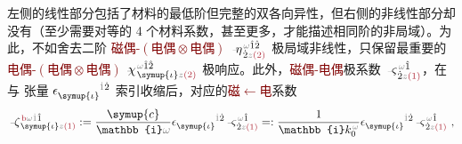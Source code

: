  左侧的线性部分包括了材料的最低阶但完整的双各向异性\cite{langeMultipoleTheoryHehl2015}，但右侧的非线性部分却没有（至少需要对等的 4 个材料系数，甚至更多，才能描述相同阶的非局域）。为此，不如舍去二阶 \textcolor{Maroon}{磁偶-$(\text{电偶}\otimes\text{电偶})$} $\Xint{\begin{smallmatrix} ~ \\ {}^{}_{\mathcolor{gray}{-}} \\ ~ \end{smallmatrix}}{17}{\eta}^{\;\! \mathcolor{gray}{\omega} \hat{1} \hat{2}}_{\;\! \dot{2} \mathcolor{gray}{z} \textcolor{Maroon}{(2)}}$ 极局域非线性，只保留最重要的\textcolor{Maroon}{电偶-$(\text{电偶}\otimes\text{电偶})$} $\Xint{{}^{}_{\mathcolor{gray}{-}}}{23}{\chi}^{\;\! \mathcolor{gray}{\omega} \hat{1} \hat{2}}_{\;\! \symup{\iota} \mathcolor{gray}{z} \textcolor{Maroon}{(2)}}$ 极响应。此外，\textcolor{Maroon}{磁偶-电偶}极系数 $\Xint{\begin{smallmatrix} ~ \\ {}^{}_{\mathcolor{gray}{-}} \\ ~ \end{smallmatrix}}{13}{\varsigma}^{\;\! \mathcolor{gray}{\omega} \hat{1}}_{\;\! \dot{2} \mathcolor{gray}{z} \textcolor{Maroon}{(1)}}$，在与 \textcolor{Maroon}{} 张量 $\epsilon^{\hphantom{\symup{\iota}}\mathcolor{gray}{\dot{1}}\dot{2}}_{\symup{\iota}}$ 索引收缩后，对应的\textcolor{Maroon}{磁$\longleftarrow$电}系数
\begin{align} \label{eq:m<-p}
	\Xint{\begin{smallmatrix} ~ \\ {}^{}_{\mathcolor{gray}{-}} \\ ~ \end{smallmatrix}}{12}{\zeta}^{\;\! \textcolor{Maroon}{\text{b}} \mathcolor{gray}{\omega} \mathcolor{gray}{\dot{1}} \hat{1}}_{\;\! \symup{\iota} \mathcolor{gray}{z} \textcolor{Maroon}{(1)}} := \frac{\symup{c}}{\mathbb{i} \mathcolor{gray}{\omega}} \epsilon^{\hphantom{\symup{\iota}}\mathcolor{gray}{\dot{1}}\dot{2}}_{\symup{\iota}} \Xint{\begin{smallmatrix} ~ \\ {}^{}_{\mathcolor{gray}{-}} \\ ~ \end{smallmatrix}}{13}{\varsigma}^{\;\! \mathcolor{gray}{\omega} \hat{1}}_{\;\! \dot{2} \mathcolor{gray}{z} \textcolor{Maroon}{(1)}} =: \frac{1}{\mathbb{i} k_0^{\;\! \mathcolor{gray}{\omega}}} \epsilon^{\hphantom{\symup{\iota}}\mathcolor{gray}{\dot{1}}\dot{2}}_{\symup{\iota}} \Xint{\begin{smallmatrix} ~ \\ {}^{}_{\mathcolor{gray}{-}} \\ ~ \end{smallmatrix}}{13}{\varsigma}^{\;\! \mathcolor{gray}{\omega} \hat{1}}_{\;\! \dot{2} \mathcolor{gray}{z} \textcolor{Maroon}{(1)}} ~,
\end{align}
